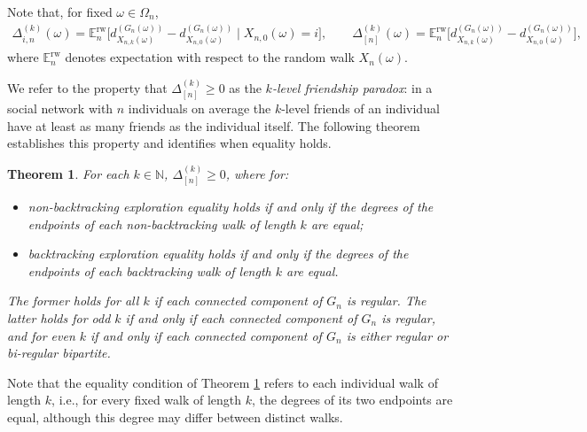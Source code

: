 \documentclass[11pt]{article}
\numberwithin{equation}{section}
\theoremstyle{plain}
\newtheorem{theorem}{Theorem}[section]
\newcommand{\N}{\mathbb N}
\newcommand{\E}{\mathbb E}
\begin{document}
\noindent
Note that, for fixed $\omega\in \Omega_{n}$, 
\begin{align*}
\Delta_{i,n}^{(k)}(\omega) = \E_{n}^{\mathrm{rw}}\Big[d_{X_{n,k}(\omega)}^{(G_{n}(\omega))}
-d_{X_{n,0}(\omega)}^{(G_{n}(\omega))}\mid X_{n,0}(\omega)=i\Big],
\qquad
\Delta_{[n]}^{(k)}(\omega) = \E_{n}^{\mathrm{rw}}\Big[d_{X_{n,k}(\omega)}^{(G_{n}(\omega))}
-d_{X_{n,0}(\omega)}^{(G_{n}(\omega))}\Big],
\end{align*} 
where $\E_{n}^{\mathrm{rw}}$ denotes expectation with respect to the random walk $X_{n}(\omega)$. 

We refer to the property that $\Delta_{[n]}^{(k)} \geq 0$ as the \emph{$k$-level friendship paradox}: in a social network with $n$ individuals on average the $k$-level friends of an individual have at least as many friends as the individual itself. The following theorem establishes this property and identifies when equality holds. 

\begin{theorem}
\label{thm0}
For each $k\in\N$, $\Delta_{[n]}^{(k)} \geq 0$, where for:
\begin{itemize}
\item[{\rm (1)}] 
non-backtracking exploration equality holds if and only if the degrees of the endpoints of each non-backtracking walk of length $k$ are equal;
\item[{\rm (2)}] 
backtracking exploration equality holds if and only if the degrees of the endpoints of each backtracking walk of length $k$ are equal. 
\end{itemize}
The former holds for all $k$ if each connected component of $G_n$ is regular. The latter holds for odd $k$ if and only if each connected component of $G_n$ is regular, and for even $k$ if and only if each connected component of $G_n$ is either regular or bi-regular bipartite.
\end{theorem}

Note that the equality condition of Theorem \ref{thm0} refers to each individual walk of length $k$, i.e., for every fixed walk of length $k$, the degrees of its two endpoints are equal, although this degree may differ between distinct walks.
\end{document}
